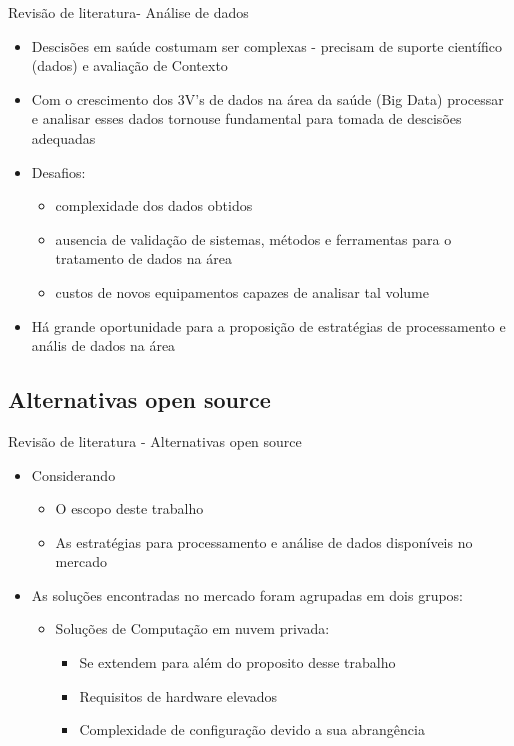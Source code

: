 \documentclass[10pt,brazil]{beamer}
\theoremstyle{definition}
\begin{document}
\begin{frame}{Revisão de literatura- Análise de dados}
  \begin{itemize}
    \item Descisões em saúde costumam ser complexas - precisam de suporte científico (dados) e avaliação de Contexto
    \item Com o crescimento dos 3V's de dados na área da saúde (Big Data) processar e analisar esses dados tornouse fundamental para tomada de descisões adequadas
    \item Desafios:
          \begin{itemize}
            \item complexidade dos dados obtidos
            \item ausencia de validação de sistemas, métodos e ferramentas para o tratamento de dados na área
            \item custos de novos equipamentos capazes de analisar tal volume
          \end{itemize}
    \item Há grande oportunidade para a proposição de estratégias de processamento e anális de dados na área
  \end{itemize}
\end{frame}

\subsection{Alternativas open source}

\begin{frame}{Revisão de literatura - Alternativas open source}
  \begin{itemize}
    \item Considerando
          \begin{itemize}
            \item O escopo deste trabalho
            \item As estratégias para processamento e análise de dados disponíveis no mercado
          \end{itemize}
    \item [] As soluções encontradas no mercado foram agrupadas em dois grupos:
          \begin{itemize}
            \item Soluções de Computação em nuvem privada:
                  \begin{itemize}
                    \item Se extendem para além do proposito desse trabalho
                    \item Requisitos de hardware elevados
                    \item Complexidade de configuração devido a sua abrangência
                  \end{itemize}
          \end{itemize}
  \end{itemize}
\end{frame}
\end{document}

